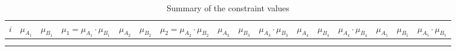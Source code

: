 \documentclass[a4paper,openany]{book}
\begin{document}
				\begin{center}
					\begin{landscape}
						\begin{longtable}[c]{|l|c|c|c|c|c|c|c|c|c|c|c|c|c|c|c|}
							\hline
							\textbf{$i$} & \textbf{$\mu_{A_1}$} & \textbf{$\mu_{B_1}$} & \textbf{$\mu_1 = \mu_{A_1}\cdot\mu_{B_1}$} & \textbf{$\mu_{A_2}$} & \textbf{$\mu_{B_2}$} & \textbf{$\mu_2 = \mu_{A_2}\cdot\mu_{B_2}$}& \textbf{$\mu_{A_3}$} & \textbf{$\mu_{B_3}$} & \textbf{$\mu_{A_3}\cdot\mu_{B_3}$}  & \textbf{$\mu_{A_4}$} & \textbf{$\mu_{B_4}$} & \textbf{$\mu_{A_4}\cdot\mu_{B_4}$} & \textbf{$\mu_{A_5}$} & \textbf{$\mu_{B_5}$} & \textbf{$\mu_{A_5}\cdot\mu_{B_5}$}\\
							\hline
							\endfirsthead
							
							
							\caption{Summary of the constraint values }\label{table:tb1}\\
							\endfoot
							


\end{longtable}
\end{landscape}
\end{center}
\end{document}
